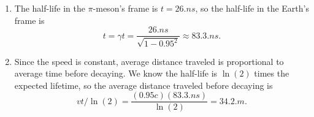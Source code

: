 \documentclass{article}
\begin{document}
\bigskip
\par
\begin{prob}
\end{prob}
\begin{enumerate}[label=(\alph*)]
    \item The half-life in the $\pi$-meson's frame is $t=26 \si{.ns}$, so the half-life in the Earth's frame is
        \[ t = \gamma t = \frac{26\si{.ns}}{\sqrt{1-0.95^2}}\approx 83.3\si{.ns}. \]
    \item Since the speed is constant, average distance traveled is proportional to average time before decaying. We know the half-life is $\ln(2)$ times the expected lifetime, so the average distance traveled before decaying is
        \[ vt/\ln(2) = \frac{(0.95 c)(83.3 \si{.ns})}{\ln(2)} = 34.2 \si{.m}. \]
        
\end{enumerate}
\end{document}
